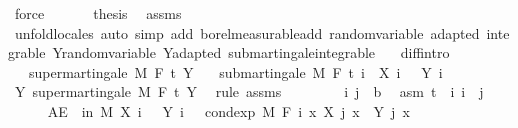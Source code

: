 \begin{isabellebody}
\ force\isanewline
\ \ \isacommand{{\isacharbraceright}{\kern0pt}}\isamarkupfalse%
\isanewline
\ \ \isamarkupfalse%
\ {\isacharquery}{\kern0pt}thesis\ \isamarkupfalse%
\ assms\ \isamarkupfalse%
\ {\isacharparenleft}{\kern0pt}unfold{\isacharunderscore}{\kern0pt}locales{\isacharparenright}{\kern0pt}\ {\isacharparenleft}{\kern0pt}auto\ simp\ add{\isacharcolon}{\kern0pt}\ borel{\isacharunderscore}{\kern0pt}measurable{\isacharunderscore}{\kern0pt}add\ random{\isacharunderscore}{\kern0pt}variable\ adapted\ integrable\ Y{\isachardot}{\kern0pt}random{\isacharunderscore}{\kern0pt}variable\ Y{\isachardot}{\kern0pt}adapted\ submartingale{\isachardot}{\kern0pt}integrable{\isacharparenright}{\kern0pt}\ \ \isanewline
{}\isamarkupfalse%
%
\endisatagproof
{\isafoldproof}%
%
\isadelimproof
\isanewline
%
\endisadelimproof
\isanewline
{}\isamarkupfalse%
\ diff{\isacharbrackleft}{\kern0pt}intro{\isacharbrackright}{\kern0pt}{\isacharcolon}{\kern0pt}\isanewline
\ \ \ {\isachardoublequoteopen}supermartingale\ M\ F\ t\ Y{\isachardoublequoteclose}\isanewline
\ \ \ {\isachardoublequoteopen}submartingale\ M\ F\ t\ {\isacharparenleft}{\kern0pt}{\isasymlambda}i\ {\isasymxi}{\isachardot}{\kern0pt}\ X\ i\ {\isasymxi}\ {\isacharminus}{\kern0pt}\ Y\ i\ {\isasymxi}{\isacharparenright}{\kern0pt}{\isachardoublequoteclose}\isanewline
%
\isadelimproof
%
\endisadelimproof
%
\isatagproof
{}\isamarkupfalse%
\ {\isacharminus}{\kern0pt}\isanewline
\ \ \isamarkupfalse%
\ Y{\isacharcolon}{\kern0pt}\ supermartingale\ M\ F\ t\ Y\ \isamarkupfalse%
\ {\isacharparenleft}{\kern0pt}rule\ assms{\isacharparenright}{\kern0pt}\isanewline
\ \ \isacommand{{\isacharbraceleft}{\kern0pt}}\isamarkupfalse%
\isanewline
\ \ \ \ \isamarkupfalse%
\ i\ j\ {\isacharcolon}{\kern0pt}{\isacharcolon}{\kern0pt}\ {\isacharprime}{\kern0pt}b\ \isamarkupfalse%
\ asm{\isacharcolon}{\kern0pt}\ {\isachardoublequoteopen}t\ {\isasymle}\ i{\isachardoublequoteclose}\ {\isachardoublequoteopen}i\ {\isasymle}\ j{\isachardoublequoteclose}\isanewline
\ \ \ \ \isamarkupfalse%
\ {\isachardoublequoteopen}AE\ {\isasymxi}\ in\ M{\isachardot}{\kern0pt}\ X\ i\ {\isasymxi}\ {\isacharminus}{\kern0pt}\ Y\ i\ {\isasymxi}\ {\isasymle}\ cond{\isacharunderscore}{\kern0pt}exp\ M\ {\isacharparenleft}{\kern0pt}F\ i{\isacharparenright}{\kern0pt}\ {\isacharparenleft}{\kern0pt}{\isasymlambda}x{\isachardot}{\kern0pt}\ X\ j\ x\ {\isacharminus}{\kern0pt}\ Y\ j\ x{\isacharparenright}{\kern0pt}\ {\isasymxi}{\isachardoublequoteclose}\ \isanewline

\end{isabellebody}
